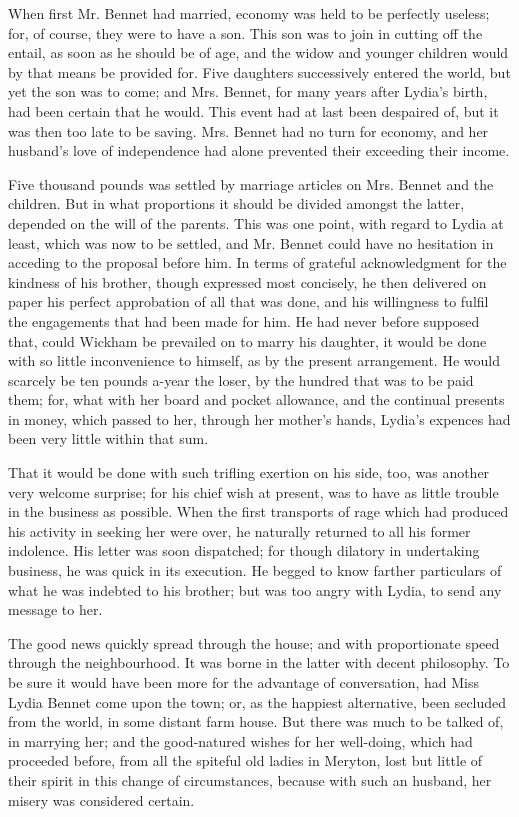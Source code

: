When first Mr. Bennet had married, economy was held
to be perfectly useless; for, of course, they were to have
a son. This son was to join in cutting off the entail, as
soon as he should be of age, and the widow and younger
children would by that means be provided for. Five
daughters successively entered the world, but yet the son
was to come; and Mrs. Bennet, for many years after
Lydia’s birth, had been certain that he would. This event
had at last been despaired of, but it was then too late to
be saving. Mrs. Bennet had no turn for economy, and her
husband’s love of independence had alone prevented their
exceeding their income.

Five thousand pounds was settled by marriage articles
on Mrs. Bennet and the children. But in what proportions
it should be divided amongst the latter, depended
on the will of the parents. This was one point, with
regard to Lydia at least, which was now to be settled,
and Mr. Bennet could have no hesitation in acceding to
the proposal before him. In terms of grateful acknowledgment
for the kindness of his brother, though expressed
most concisely, he then delivered on paper his perfect
approbation of all that was done, and his willingness to
fulfil the engagements that had been made for him. He
had never before supposed that, could Wickham be prevailed
on to marry his daughter, it would be done with
so little inconvenience to himself, as by the present
arrangement. He would scarcely be ten pounds a-year
the loser, by the hundred that was to be paid them;
for, what with her board and pocket allowance, and the
continual presents in money, which passed to her, through
her mother’s hands, Lydia’s expences had been very little
within that sum.

That it would be done with such trifling exertion on
his side, too, was another very welcome surprise; for his
chief wish at present, was to have as little trouble in the
business as possible. When the first transports of rage
which had produced his activity in seeking her were over,
he naturally returned to all his former indolence. His
letter was soon dispatched; for though dilatory in undertaking
business, he was quick in its execution. He begged
to know farther particulars of what he was indebted to
his brother; but was too angry with Lydia, to send any
message to her.

The good news quickly spread through the house; and
with proportionate speed through the neighbourhood. It
was borne in the latter with decent philosophy. To be
sure it would have been more for the advantage of conversation,
had Miss Lydia Bennet come upon the town;
or, as the happiest alternative, been secluded from the
world, in some distant farm house. But there was much
to be talked of, in marrying her; and the good-natured
wishes for her well-doing, which had proceeded before,
from all the spiteful old ladies in Meryton, lost but
little of their spirit in this change of circumstances,
because with such an husband, her misery was considered
certain.

